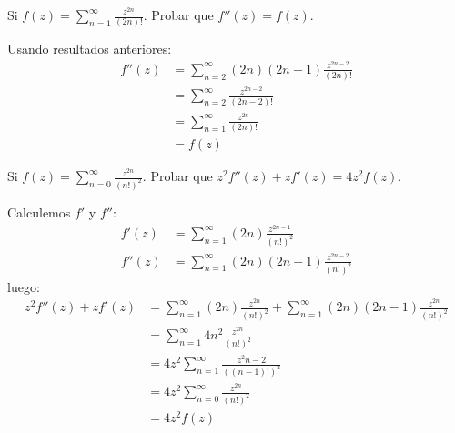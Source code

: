 \begin{homeworkProblem}
  Si $f(z)=\sum_{n=1}^{\infty}\frac{z^{2n}}{(2n)!}$. Probar que $f''(z)=f(z)$.
  \begin{solution}
    Usando resultados anteriores:
    \begin{align*}
      f''(z)&=\sum_{n=2}^{\infty}(2n)(2n-1)\frac{z^{2n-2}}{(2n)!}\\
      &=\sum_{n=2}^{\infty}\frac{z^{2n-2}}{(2n-2)!}\\
      &=\sum_{n=1}^{\infty}\frac{z^{2n}}{(2n)!}\\
      &=f(z)
    \end{align*}
  \end{solution}
\end{homeworkProblem}
\begin{homeworkProblem}
  Si $f(z)=\sum_{n=0}^{\infty}\frac{z^{2n}}{(n!)^2}$. Probar que $z^2f''(z)+zf'(z)=4z^2f(z)$.
  \begin{solution}
    Calculemos $f'$ y $f''$:
    \begin{align*}
      f'(z)&=\sum_{n=1}^{\infty}(2n)\frac{z^{2n-1}}{(n!)^2}\\
      f''(z)&=\sum_{n=1}^{\infty}(2n)(2n-1)\frac{z^{2n-2}}{(n!)^2}
    \end{align*}
    luego:
    \begin{align*}
      z^2f''(z)+zf'(z)&=\sum_{n=1}^{\infty}(2n)\frac{z^{2n}}{(n!)^2}+\sum_{n=1}^{\infty}(2n)(2n-1)\frac{z^{2n}}{(n!)^2}\\
      &=\sum_{n=1}^{\infty}4n^2\frac{z^{2n}}{(n!)^2}\\
      &=4z^2\sum_{n=1}^{\infty}\frac{z^2n-2}{((n-1)!)^2}\\
      &=4z^2\sum_{n=0}^{\infty}\frac{z^{2n}}{(n!)^2}\\
      &=4z^2f(z)
    \end{align*}
  \end{solution}
\end{homeworkProblem}
